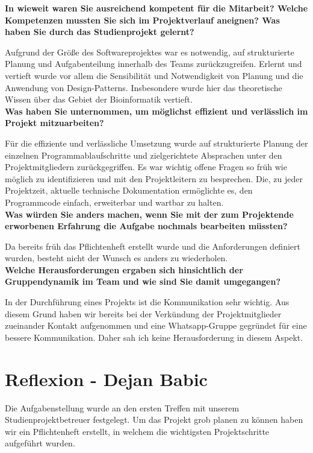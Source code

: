 \textbf{In wieweit waren Sie ausreichend kompetent für die Mitarbeit? Welche Kompetenzen
mussten Sie sich im Projektverlauf aneignen? Was haben Sie durch das
Studienprojekt gelernt?}

Aufgrund der Größe des Softwareprojektes war es notwendig, auf strukturierte Planung und
Aufgabenteilung innerhalb des Teams zurückzugreifen. Erlernt und vertieft wurde vor allem die Sensibilität und Notwendigkeit von Planung und die Anwendung von Design-Patterns. Insbesondere wurde hier das theoretische Wissen über das Gebiet der Bioinformatik vertieft.
\\

\textbf{Was haben Sie unternommen, um möglichst effizient und verlässlich im Projekt
mitzuarbeiten?}

Für die effiziente und verlässliche Umsetzung wurde auf strukturierte Planung der
einzelnen Programmablaufschritte und zielgerichtete Absprachen unter den
Projektmitgliedern zurückgegriffen. Es war wichtig offene Fragen so früh wie möglich zu
identifizieren und mit den Projektleitern zu besprechen. Die, zu jeder Projektzeit, aktuelle
technische Dokumentation ermöglichte es, den Programmcode einfach, erweiterbar und
wartbar zu halten.
\\

\textbf{Was würden Sie anders machen, wenn Sie mit der zum Projektende erworbenen
Erfahrung die Aufgabe nochmals bearbeiten müssten?}

Da bereits früh das Pflichtenheft erstellt wurde und die Anforderungen definiert wurden, besteht nicht der Wunsch es anders zu wiederholen.
\\

\textbf{Welche Herausforderungen ergaben sich hinsichtlich der Gruppendynamik im Team
und wie sind Sie damit umgegangen?}

In der Durchführung eines Projekts ist die Kommunikation sehr wichtig. Aus diesem Grund haben wir bereits bei der Verkündung der Projektmitglieder zueinander Kontakt aufgenommen und eine Whatsapp-Gruppe gegründet für eine bessere Kommunikation. Daher sah ich keine Herausforderung in diesem Aspekt.
\newpage
\chapter{Reflexion - Dejan Babic}

Die Aufgabenstellung wurde an den ersten Treffen mit unserem Studienprojektbetreuer festgelegt. Um das Projekt grob planen zu können haben wir ein Pflichtenheft erstellt, in welchem die wichtigsten Projektschritte aufgeführt wurden.
\\

